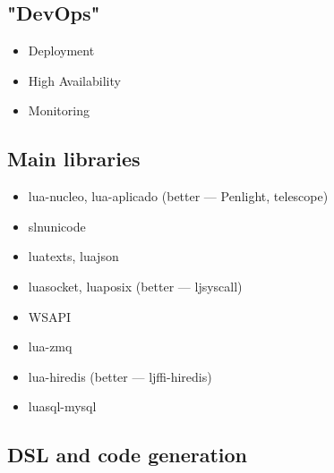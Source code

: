 \documentclass[aspectratio=169,handout,bigger]{beamer}
\begin{document}
\subsection*{"DevOps"}

\begin{frame}
  \begin{itemize}
    \item Deployment
    \item High Availability
    \item Monitoring
  \end{itemize}
\end{frame}


\subsection*{Main libraries}

\begin{frame}
  \begin{itemize}
    \item lua-nucleo, lua-aplicado (better — Penlight, telescope)
    \item slnunicode
    \item luatexts, luajson
    \item luasocket, luaposix (better — ljsyscall)
    \item WSAPI
    \item lua-zmq
    \item lua-hiredis (better — ljffi-hiredis)
    \item luasql-mysql
  \end{itemize}
\end{frame}


\subsection*{DSL and code generation}
\end{document}
